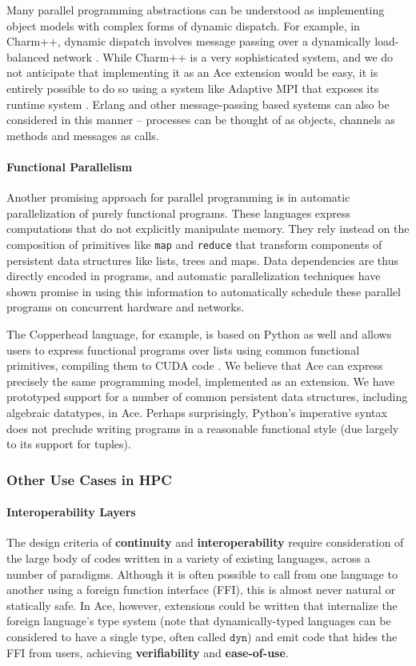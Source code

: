 \documentclass[9pt,preprint]{sigplanconf}
\begin{document}
Many parallel programming abstractions can be understood as implementing object models with complex forms of dynamic dispatch. For example, in Charm++, dynamic dispatch involves message passing over a dynamically load-balanced network \cite{kale1993charm++}. While Charm++ is a very sophisticated system, and we do not anticipate that implementing it as an Ace extension would be easy, it is entirely possible to do so using a system like Adaptive MPI that exposes its runtime system \cite{kale2009charm++}. Erlang and other message-passing based systems can also be considered in this manner -- processes can be thought of as objects, channels as methods and messages as calls.

\paragraph{Functional Parallelism}
Another promising approach for parallel programming is in automatic parallelization of purely functional programs. These languages express computations that do not explicitly manipulate memory. They rely instead on the composition of primitives like \verb|map| and \verb|reduce| that transform components of persistent data structures like lists, trees and maps. Data dependencies are thus directly encoded in programs, and automatic parallelization techniques have shown promise in using this information to automatically schedule these parallel programs on concurrent hardware and networks.

The Copperhead language, for example, is based on Python as well and allows users to express functional programs over lists using common functional primitives, compiling them to CUDA code \cite{catanzaro2011copperhead}. We believe that Ace can express precisely the same programming model, implemented as an extension. We have prototyped support for a number of common persistent data structures, including algebraic datatypes, in Ace. Perhaps surprisingly, Python's imperative syntax does not preclude writing programs in a reasonable functional style (due largely to its support for tuples).

\subsubsection{Other Use Cases in HPC}
\paragraph{Interoperability Layers}
The design criteria of \textbf{continuity} and \textbf{interoperability} require consideration of the large body of codes written in a variety of existing languages, across a number of paradigms. Although it is often possible to call from one language to another using a foreign function interface (FFI), this is almost never natural or statically safe. In Ace, however, extensions could be written that internalize the foreign language's type system (note that dynamically-typed languages can be considered to have a single type, often called $\mathtt{dyn}$) and emit code that hides the FFI from users, achieving \textbf{verifiability} and \textbf{ease-of-use}.
\end{document}
